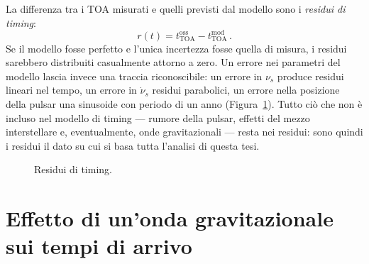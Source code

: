 La differenza tra i TOA misurati e quelli previsti dal modello sono i \textit{residui di timing}:
\begin{equation}
    r(t) = t_{\mathrm{TOA}}^{\mathrm{oss}} - t_{\mathrm{TOA}}^{\mathrm{mod}} \, .
    \label{eq:residui}
\end{equation}
Se il modello fosse perfetto e l'unica incertezza fosse quella di misura, i residui sarebbero distribuiti casualmente attorno a zero. Un errore nei parametri del modello lascia invece una traccia riconoscibile: un errore in $\nu_s$ produce residui lineari nel tempo, un errore in $\dot{\nu}_s$ residui parabolici, un errore nella posizione della pulsar una sinusoide con periodo di un anno (Figura~\ref{fig:residui_esempio}). Tutto ciò che non è incluso nel modello di timing --- rumore della pulsar, effetti del mezzo interstellare e, eventualmente, onde gravitazionali --- resta nei residui: sono quindi i residui il dato su cui si basa tutta l'analisi di questa tesi.

\begin{figure}[h!]
    \centering
    \caption{\footnotesize Residui di timing.}
    \label{fig:residui_esempio}
\end{figure}

\section{Effetto di un'onda gravitazionale sui tempi di arrivo} \label{sec:risposta_GW}

